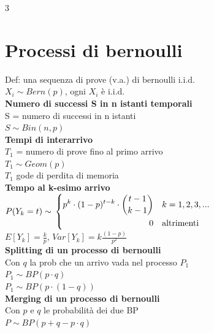 \documentclass{article}
\begin{document}
\begin{multicols*}{3}
		\section{Processi di bernoulli}
		Def: una sequenza di prove (v.a.) di bernoulli i.i.d.\\
		\(X_i \sim Bern(p) \), ogni \(X_i\) è i.i.d.\\
		\textbf{Numero di successi S in n istanti temporali}\\
		S = numero di successi in n istanti\\
		\(S \sim Bin(n,p)\) \\
		\textbf{Tempi di interarrivo}\\
		\(T_1\) = numero di prove fino al primo arrivo\\
		\(T_1 \sim Geom(p)\)\\
		\(T_1\) gode di perdita di memoria\\
		\textbf{Tempo al k-esimo arrivo}\\
		\(P(Y_k = t) \sim \\ \left\{
		\begin{alignedat}{2}
			p^k\cdot (1-p)^{t-k}\cdot\binom{t-1}{k-1}  & \quad k=1,2,3,...\\
			0            & \quad \text{altrimenti}
		\end{alignedat}
		\right.\)\\
		\(E[Y_k] = \frac{k}{p}\), \(Var[Y_k]= k\frac{(1-p)}{p^2}\)\\
		\textbf{Splitting di un processo di bernoulli}\\
		Con \(q\) la prob che un arrivo vada nel processo \(P_1\)\\
		\(P_1 \sim BP(p\cdot q)\)\\
		\(P_1 \sim BP(p\cdot (1-q))\)\\
		\textbf{Merging di un processo di bernoulli}\\
		Con \(p\) e \(q\) le probabilità dei due BP\\
		\(P\sim BP(p+q-p\cdot q)\)\\

\end{multicols*}
\end{document}
